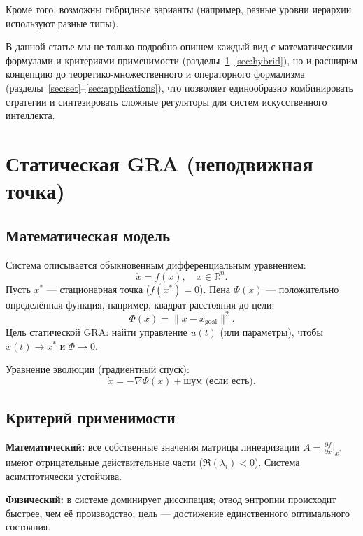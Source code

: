 \documentclass[12pt,a4paper]{article}
\newcommand{\R}{\mathbb{R}}
\begin{document}
Кроме того, возможны гибридные варианты (например, разные уровни иерархии используют разные типы).

В данной статье мы не только подробно опишем каждый вид с математическими формулами и критериями применимости (разделы~\ref{sec:static}--\ref{sec:hybrid}), но и расширим концепцию до теоретико-множественного и операторного формализма (разделы~\ref{sec:set}--\ref{sec:applications}), что позволяет единообразно комбинировать стратегии и синтезировать сложные регуляторы для систем искусственного интеллекта.

\section{Статическая GRA (неподвижная точка)}
\label{sec:static}

\subsection{Математическая модель}

Система описывается обыкновенным дифференциальным уравнением:
\begin{equation}
    \dot{x} = f(x), \quad x \in \R^n.
\end{equation}
Пусть $x^*$ — стационарная точка ($f(x^*) = 0$). Пена $\Phi(x)$ — положительно определённая функция, например, квадрат расстояния до цели:
\begin{equation}
    \Phi(x) = \| x - x_{\text{goal}} \|^2.
\end{equation}
Цель статической GRA: найти управление $u(t)$ (или параметры), чтобы $x(t) \to x^*$ и $\Phi \to 0$.

Уравнение эволюции (градиентный спуск):
\begin{equation}
    \dot{x} = -\nabla \Phi(x) + \text{шум (если есть)}.
\end{equation}

\subsection{Критерий применимости}

\textbf{Математический:} все собственные значения матрицы линеаризации $A = \frac{\partial f}{\partial x}\big|_{x^*}$ имеют отрицательные действительные части ($\Re(\lambda_i) < 0$). Система асимптотически устойчива.

\textbf{Физический:} в системе доминирует диссипация; отвод энтропии происходит быстрее, чем её производство; цель — достижение единственного оптимального состояния.
\end{document}
